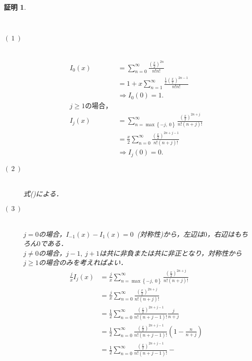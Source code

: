 \documentclass[a4j,papersize,disablejfam,slide,14pt]{jsarticle}
\newtheorem{Proof}{証明}
\def\max#1#2{\operatorname{max} \left\{ #1,\ #2 \right\}} %
\begin{document}
    \begin{Proof}
    	\begin{description}
        	\item[]\mbox{}\\
        	\item[$(\ 1\ )$]\mbox{}\\
            	\begin{align}
                	I_0(x) &= \sum_{n=0}^{\infty} \frac{\left( \frac{x}{2} \right)^{2n}}{n!n!} \\
                    &= 1 + x \sum_{n=1}^{\infty} \frac{\frac{1}{2}\left( \frac{x}{2} \right)^{2n-1}}{n!n!} \\
                    &\Rightarrow I_0(0) = 1. \\
                    \mbox{$j \geq 1$の場合，}&\\
                    I_j(x) &= \sum_{n=\max{-j}{0}}^{\infty} \frac{\left( \frac{x}{2} \right)^{2n+j}}{n!(n+j)!} \\
                    &= \frac{x}{2} \sum_{n=0}^{\infty} \frac{\left( \frac{x}{2} \right)^{2n+j-1}}{n!(n+j)!} \\
                    &\Rightarrow I_j(0) = 0.
                \end{align}
            \item[$(\ 2\ )$]\mbox{}\\
            	式()による．
            \item[$(\ 3\ )$]\mbox{}\\
            	$j=0$の場合，$I_{-1}(x) - I_{1}(x)=0$\ (対称性)から，左辺は$0$，右辺はもちろん$0$である．\\
                $j \neq 0$の場合，$j-1,\ j+1$は共に非負または共に非正となり，対称性から$j \geq 1$の場合のみを考えればよい．
            	\begin{align}
                	\frac{j}{x} I_j(x) &= \frac{j}{x} \sum_{n=\max{-j}{0}}^{\infty} \frac{\left( \frac{x}{2} \right)^{2n+j}}{n!(n+j)!} \\
                    &= \frac{j}{x} \sum_{n=0}^{\infty} \frac{\left( \frac{x}{2} \right)^{2n+j}}{n!(n+j)!} \\
                    &= \frac{1}{2} \sum_{n=0}^{\infty} \frac{\left( \frac{x}{2} \right)^{2n+j-1}}{n!(n+j-1)!} \frac{j}{n+j} \\
                    &= \frac{1}{2} \sum_{n=0}^{\infty} \frac{\left( \frac{x}{2} \right)^{2n+j-1}}{n!(n+j-1)!} \left(1 - \frac{n}{n+j} \right) \\
                    &= \frac{1}{2} \sum_{n=0}^{\infty} \frac{\left( \frac{x}{2} \right)^{2n+j-1}}{n!(n+j-1)!} -

\end{align}
\end{description}
\end{Proof}
\end{document}
